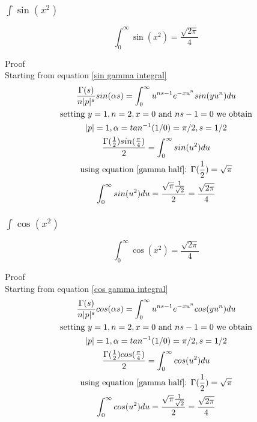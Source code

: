 \documentclass[a4paper]{article}
\begin{document}
\subsubsection{$\int \sin(x^2)$}

\begin{theorem}
\begin{equation}
\boxed{
\int_{0}^{\infty} \sin(x^2) = \frac{\sqrt{2\pi}}{4}
}
\end{equation}

Proof
\\
Starting from equation \ref{sin gamma integral}
\begin{gather*}
\frac{\Gamma(s)}{n |p|^s} sin(\alpha s)= \int_{0}^{\infty} u^{ns -1} e^{-x u^{n}} sin(y u^n) du
\\
\text{setting $y=1, n=2, x=0$ and $ns -1 = 0$ we obtain}
\\
|p| = 1, \alpha = tan^{-1}(1/0) = \pi/2, s = 1/2
\\
\frac{\Gamma(\frac{1}{2}) sin(\frac{\pi}{4})}{2} = \int_{0}^{\infty} sin(u^2) du
\\
\text{using equation \ref{gamma half}: } \Gamma(\frac{1}{2}) = \sqrt{\pi}
\\
\int_{0}^{\infty} sin(u^2) du = \frac{\sqrt{\pi} \frac{1}{\sqrt{2}}}{2}
= \frac{\sqrt{2\pi}}{4}
\end{gather*}
\end{theorem}

\subsubsection{$\int \cos(x^2)$}

\begin{theorem}
\begin{equation}
\boxed{
\int_{0}^{\infty} \cos(x^2) = \frac{\sqrt{2\pi}}{4}
}
\end{equation}

Proof
\\
Starting from equation \ref{cos gamma integral}
\begin{gather*}
\frac{\Gamma(s)}{n |p|^s} cos(\alpha s)= \int_{0}^{\infty} u^{ns -1} e^{-x u^{n}} cos(y u^n) du
\\
\text{setting $y=1, n=2, x=0$ and $ns -1 = 0$ we obtain}
\\
|p| = 1, \alpha = tan^{-1}(1/0) = \pi/2, s = 1/2
\\
\frac{\Gamma(\frac{1}{2}) cos(\frac{\pi}{4})}{2} = \int_{0}^{\infty} cos(u^2) du
\\
\text{using equation \ref{gamma half}: } \Gamma(\frac{1}{2}) = \sqrt{\pi}
\\
\int_{0}^{\infty} cos(u^2) du = \frac{\sqrt{\pi} \frac{1}{\sqrt{2}}}{2}
= \frac{\sqrt{2\pi}}{4}
\end{gather*}
\end{theorem}
\end{document}
